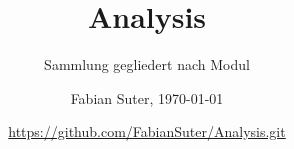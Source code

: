 \documentclass[8pt, a4paper, fleqn, landscape]{scrartcl}
\title{Analysis}
\subtitle{Sammlung gegliedert nach Modul}
\author{Fabian Suter, \today}
\date{{\small \url{https://github.com/FabianSuter/Analysis.git}}}
\begin{document}
	\begin{multicols*}{3}
		\maketitle

		


	
	\end{multicols*}	
\end{document}
